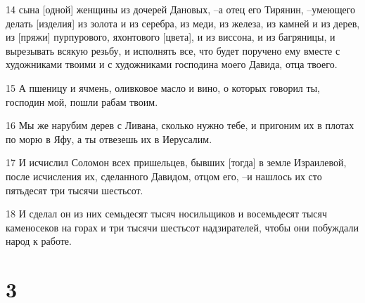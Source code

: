 \par 14 сына [одной] женщины из дочерей Дановых, --а отец его Тирянин, --умеющего делать [изделия] из золота и из серебра, из меди, из железа, из камней и из дерев, из [пряжи] пурпурового, яхонтового [цвета], и из виссона, и из багряницы, и вырезывать всякую резьбу, и исполнять все, что будет поручено ему вместе с художниками твоими и с художниками господина моего Давида, отца твоего.
\par 15 А пшеницу и ячмень, оливковое масло и вино, о которых говорил ты, господин мой, пошли рабам твоим.
\par 16 Мы же нарубим дерев с Ливана, сколько нужно тебе, и пригоним их в плотах по морю в Яфу, а ты отвезешь их в Иерусалим.
\par 17 И исчислил Соломон всех пришельцев, бывших [тогда] в земле Израилевой, после исчисления их, сделанного Давидом, отцом его, --и нашлось их сто пятьдесят три тысячи шестьсот.
\par 18 И сделал он из них семьдесят тысяч носильщиков и восемьдесят тысяч каменосеков на горах и три тысячи шестьсот надзирателей, чтобы они побуждали народ к работе.

\chapter{3}

